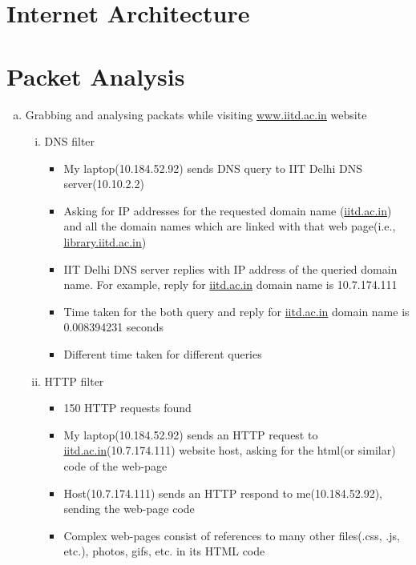 \documentclass{article}
\begin{document}
\section{Internet Architecture}
\section{Packet Analysis}
    \begin{enumerate}[a)]
        \item Grabbing and analysing packats while visiting \href{www.iitd.ac.in}{www.iitd.ac.in} website
            \begin{enumerate}[i)]
                \item DNS filter
                    \begin{itemize}
                        \item My laptop(10.184.52.92) sends DNS query to IIT Delhi DNS server(10.10.2.2)
                        \item Asking for IP addresses for the requested domain name (\href{www.iitd.ac.in}{iitd.ac.in}) and all the domain names which are linked with that web page(i.e., \href{www.library.iitd.ac.in}{library.iitd.ac.in})
                        \item IIT Delhi DNS server replies with IP address of the queried domain name. For example, reply for \href{www.iitd.ac.in}{iitd.ac.in} domain name is 10.7.174.111
                        \item Time taken for the both query and reply for \href{www.iitd.ac.in}{iitd.ac.in} domain name is 0.008394231 seconds
                        \item Different time taken for different queries
                    \end{itemize}{}
                \item HTTP filter
                    \begin{itemize}
                        \item 150 HTTP requests found
                        \item My laptop(10.184.52.92) sends an HTTP request to \href{www.iitd.ac.in}{iitd.ac.in}(10.7.174.111) website host, asking for the html(or similar) code of the web-page
                        \item Host(10.7.174.111) sends an HTTP respond to me(10.184.52.92), sending the web-page code
                        \item Complex web-pages consist of references to many other files(.css, .js, etc.), photos, gifs,  etc. in its HTML code

\end{itemize}
\end{enumerate}
\end{enumerate}
\end{document}

